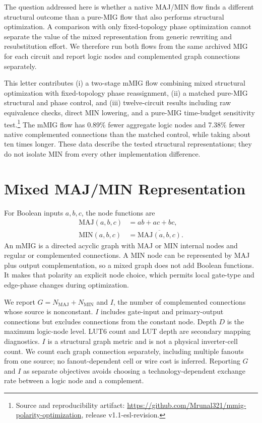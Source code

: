 \documentclass[10pt,journal]{IEEEtran}
\begin{document}
The question addressed here is whether a native MAJ/MIN flow finds a
different structural outcome than a pure-MIG flow that also performs
structural optimization. A comparison with only fixed-topology phase
optimization cannot separate the value of the mixed representation from
generic rewriting and resubstitution effort. We therefore run both flows
from the same archived MIG for each circuit and report logic nodes and
complemented graph connections separately.

This letter contributes (i) a two-stage mMIG flow combining mixed structural
optimization with fixed-topology phase reassignment, (ii) a matched
pure-MIG structural and phase control, and (iii) twelve-circuit results
including raw equivalence checks, direct MIN lowering, and a pure-MIG
time-budget sensitivity test.\footnote{Source and reproducibility artifact:
\url{https://github.com/Mrunal321/mmig-polarity-optimization}, release
v1.1-esl-revision.} The mMIG flow has 0.89\% fewer aggregate
logic nodes and 7.38\% fewer native complemented connections than the
matched control, while taking about ten times longer. These data describe
the tested structural representations; they do not isolate MIN from every
other implementation difference.

\section{Mixed MAJ/MIN Representation}
\label{sec:representation}
For Boolean inputs $a,b,c$, the node functions are
\begin{equation}
\begin{aligned}
\mathrm{MAJ}(a,b,c)&=ab+ac+bc,\\
\mathrm{MIN}(a,b,c)&=\overline{\mathrm{MAJ}(a,b,c)}.
\end{aligned}
\label{eq:gates}
\end{equation}
An mMIG is a directed acyclic graph with MAJ or MIN internal nodes
and regular or complemented connections. A MIN node can be represented
by MAJ plus output complementation, so a mixed graph does not add Boolean
functions. It makes that polarity an explicit node choice, which permits
local gate-type and edge-phase changes during optimization.

We report $G=N_{\mathrm{MAJ}}+N_{\mathrm{MIN}}$ and $I$, the number of
complemented connections whose source is nonconstant. $I$ includes
gate-input and primary-output connections but excludes connections from
the constant node. Depth $D$ is the maximum logic-node level. LUT6 count
and LUT depth are secondary mapping diagnostics. $I$ is a structural graph
metric and is not a physical inverter-cell count.
We count each graph connection separately, including multiple fanouts
from one source; no fanout-dependent cell or wire cost is inferred.
Reporting $G$ and $I$ as separate objectives avoids choosing a
technology-dependent exchange rate between a logic node and a complement.
\end{document}

